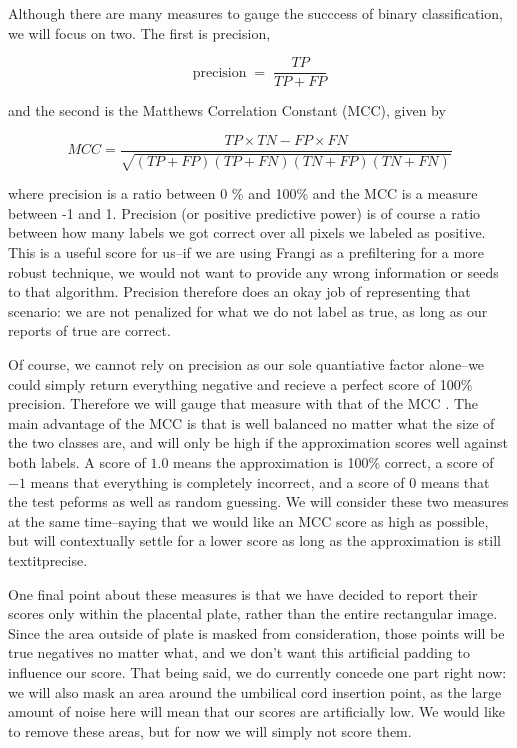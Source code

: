 Although there are many measures to gauge the succcess of binary classification, we will focus on two. The first is precision, 

\begin{equation}
\label{eq:precision}
\textrm{precision} \;=\; \frac{TP}{TP+FP}
\end{equation}

and the second is the Matthews Correlation Constant (MCC), given by

\begin{equation} \label{eq:MCC}
MCC = \frac{TP\times TN - FP \times FN}{\sqrt{ (TP + FP)(TP+FN)(TN+FP)(TN+FN)}}
\end{equation}

where precision is a ratio between 0 \% and 100\% and the MCC is a measure between -1 and 1. Precision (or positive predictive power) is of course a ratio between how many labels we got correct over all pixels we labeled as positive. This is a useful score for us--if we are using Frangi as a prefiltering for a more robust technique, we would not want to provide any wrong information or seeds to that algorithm. Precision therefore does an okay job of representing that scenario: we are not penalized for what we do not label as true, as long as our reports of true are correct.

Of course, we cannot rely on precision as our sole quantiative factor alone--we could simply return everything negative and recieve a perfect score of 100\% precision. Therefore we will gauge that measure with that of the MCC \cite{mcc-original-paper}. The main advantage of the MCC is that is well balanced no matter what the size of the two classes are, and will only be high if the approximation scores well against both labels. A score of $1.0$ means the approximation is 100\% correct, a score of $-1$ means that everything is completely incorrect, and a score of $0$ means that the test peforms as well as random guessing.  We will consider these two measures at the same time--saying that we would like an MCC score as high as possible, but will contextually settle for a lower score as long as the approximation is still textit{precise}.

One final point about these measures is that we have decided to report their scores only within the placental plate, rather than the entire rectangular image. Since the area outside of plate is masked from consideration, those points will be true negatives no matter what, and we don't want this artificial padding to influence our score. That being said, we do currently concede one part right now: we will also mask an area around the umbilical cord insertion point, as the large amount of noise here will mean that our scores are artificially low. We would like to remove these areas, but for now we will simply not score them. 




